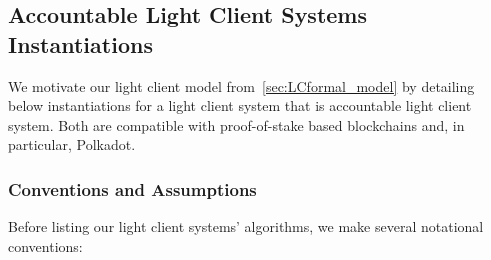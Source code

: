 \subsection{Accountable Light Client Systems Instantiations}
\label{sec:LCinstantiation} 

\noindent We motivate our light client model from~\ref{sec:LCformal_model} by detailing below instantiations 
for a light client system that is accountable light client system. Both are 
compatible with proof-of-stake based blockchains and, in particular, Polkadot.

\subsubsection{Conventions and Assumptions}
\label{sec:conventions}

\noindent Before listing our light client systems' algorithms, we make several notational conventions:

